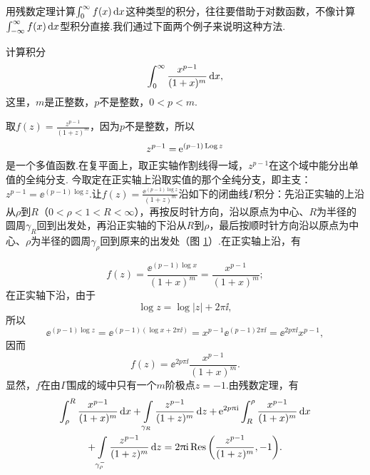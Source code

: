 用残数定理计算$\int_0^\infty f(x)\mathop{}\!\mathrm dx$这种类型的积分，往往要借助于对数函数，不像计算$\int_{-\infty}^\infty f(x)\mathop{}\!\mathrm dx$型积分直接.我们通过下面两个例子来说明这种方法.
\begin{example}\label{exam5.5.11}
  计算积分
  \[
    \int_0^\infty\frac{x^{p-1}}{(1+x)^m}\mathop{}\!\mathrm dx,
  \]
  这里，$m$是正整数，$p$不是整数，$0<p<m$.
\end{example}
\begin{solution}
  取$f(z)=\frac{z^{p-1}}{(1+z)^m}$，因为$p$不是整数，所以
  \[
    z^{p-1} = \operatorname{\!\!\;\mathrm e}^{(p-1)\operatorname{Log} z}
  \]
  是一个多值函数.在复平面上，取正实轴作割线得一域，$z^{p-1}$在这个域中能分出单值的全纯分支. 今取定在正实轴上沿取实值的那个全纯分支，即主支：$z^{p-1}=\ee^{(p-1)\log z}$.让$f(z)=
  \frac{\ee^{(p-1)\log z}}{(1+z)^m}$沿如下的闭曲线$\Gamma$积分：先沿正实轴的上沿从$\rho$到$R$（$0<\rho<1<R<\infty$），再按反时针方向，沿以原点为中心、$R$为半径的圆周$\gamma_R$回到出发处，再沿正实轴的下沿从$R$到$\rho$，最后按顺时针方向沿以原点为中心、$\rho$为半径的圆周$\gamma_\rho$回到原来的出发处（图 \ref{fig5.4}）.在正实轴上沿，有
  \begin{figure}[!ht]
    \centering
    \caption{\label{fig5.4}}
  \end{figure}
  \[
    f(z) = \frac{\ee^{(p-1)\log x}}{(1+x)^m} = \frac{x^{p-1}}{(1+x)^m};
  \]
  在正实轴下沿，由于
  \[
    \log z = \log|z|+2\pi\ii,
  \]
  所以
  \[
    \ee^{(p-1)\log z} = \ee^{(p-1)(\log x+2\pi\ii)} = x^{p-1}\ee^{(p-1)2\pi\ii} = \ee^{2p\pi\ii}x^{p-1},
  \]
  因而
  \[
    f(z) = \ee^{2p\pi\ii}\frac{x^{p-1}}{(1+x)^m}.
  \]
  显然，$f$在由$\Gamma$围成的域中只有一个$m$阶极点$z=-1$.由残数定理，有
  \begin{equation}\label{eq5.5.7}
    \begin{gathered}
      \int_\rho^R\frac{x^{p-1}}{(1+x)^m}\dx+\int\limits_{\gamma_R}\frac{z^{p-1}}{(1+z)^m}\dz
      + \ee^{2p\pi\ii}\int_R^\rho\frac{x^{p-1}}{(1+x)^m}\dx\\
      + \int\limits_{\gamma_\rho^-}\frac{z^{p-1}}{(1+z)^m}\dz=
      2\pi\ii\Res\bigg(\frac{z^{p-1}}{(1+z)^m},-1\bigg).

\end{gathered}
\end{equation}
\end{solution}
